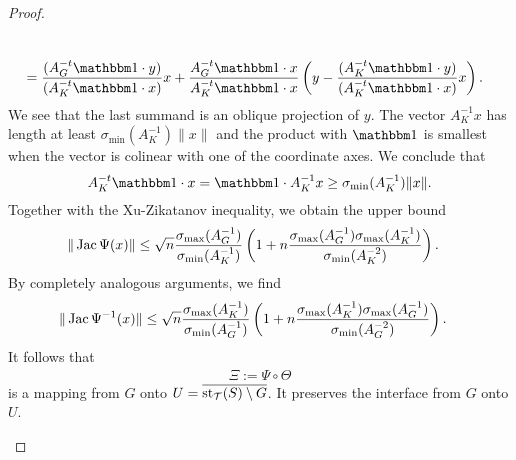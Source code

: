 \documentclass[10pt,letterpaper]{article}
\begin{document}
\begin{proof}
\begin{itemize}
\begin{align*}
            \\&= 
            \frac{ 
                ( A_{{G}}^{-t} \vecone \cdot y ) 
            }{ 
                ( A_{K}^{-t} \vecone \cdot  x )
            } 
            x
            +
            \frac{ A_{{G}}^{-t} \vecone \cdot x }{ A_{K}^{-t} \vecone \cdot  x } 
            \left( 
                y
                -
                \frac{ 
                    ( A_{K}^{-t} \vecone \cdot y ) 
                }{ 
                    ( A_{K}^{-t} \vecone \cdot  x ) 
                } 
                x
            \right)
            .
        \end{align*}
        We see that the last summand is an oblique projection of $y$. 
        The vector $A_{K}^{-1} x$ has length at least $\sigma_{\min}( A_{K}^{-1} ) \| x \|$ and the product with $\vecone$ is smallest when the vector is colinear with one of the coordinate axes. We conclude that 
        \[
             A_{K}^{-t} \vecone \cdot x 
             = 
             \vecone \cdot A_{K}^{-1} x 
             \geq 
             \sigma_{\min}( A_{K}^{-1} ) \| x \|.
        \]
        Together with the Xu-Zikatanov inequality, we obtain the upper bound 
        \begin{align*}
            \| \operatorname{{\rm Jac}} \Psi(x) \|
            &\leq 
            \sqrt{n}
            \frac{ \sigma_{\max}( A_{{G}}^{-1} ) }{ \sigma_{\min}( A_{K}^{-1} ) }
            \left( 
            1
            + 
            n
            \frac{ \sigma_{\max}( A_{{G}}^{-1} ) \sigma_{\max}( A_{K}^{-1} ) }{ \sigma_{\min}( A_{K}^{-2} ) }
            \right) 
            .
        \end{align*}
        By completely analogous arguments, we find 
        \begin{align*}
            \| \operatorname{{\rm Jac}} \Psi^{-1}(x) \|
            &\leq 
            \sqrt{n}
            \frac{ \sigma_{\max}( A_{K}^{-1} ) }{ \sigma_{\min}( A_{{G}}^{-1} ) }
            \left( 
            1
            + 
            n
            \frac{ \sigma_{\max}( A_{K}^{-1} ) \sigma_{\max}( A_{{G}}^{-1} ) }{ \sigma_{\min}( A_{{G}}^{-2} ) }
            \right) 
            .
        \end{align*}
        It follows that 
        \begin{align*}
            \Xi := \Psi \circ \Theta
        \end{align*}
        is a mapping from ${G}$ onto $U = \overline{\operatorname{st}_{{\mathcal T}}(S) \setminus {G}}$.
        It preserves the interface from ${G}$ onto $U$. 
        

\end{itemize}
\end{proof}
\end{document}
